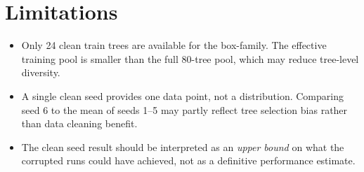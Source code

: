 \documentclass[11pt]{article}
\begin{document}
\section{Limitations}

\begin{itemize}
  \item Only 24 clean train trees are available for the box-family.  The
    effective training pool is smaller than the full 80-tree pool, which
    may reduce tree-level diversity.
  \item A single clean seed provides one data point, not a distribution.
    Comparing seed 6 to the mean of seeds 1--5 may partly reflect tree
    selection bias rather than data cleaning benefit.
  \item The clean seed result should be interpreted as an \emph{upper bound}
    on what the corrupted runs could have achieved, not as a definitive
    performance estimate.
\end{itemize}
\end{document}

